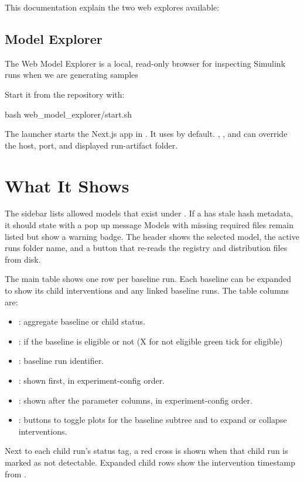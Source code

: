 \documentclass[11pt]{article}
\begin{document}
\label{docstart:web_model_explorer}
This documentation explain the two web explores available:
\subsection*{Model Explorer}

The Web Model Explorer is a local, read-only browser for inspecting \name{} Simulink runs when we are generating samples

Start it from the repository with:
\begin{DocCode}
bash web_model_explorer/start.sh
\end{DocCode}

The launcher starts the Next.js app in . 
It uses  by default. 
, , and  can override the host, port, and displayed run-artifact folder. 

\section*{What It Shows}

The sidebar lists allowed \name{} models that exist under . If a  has stale hash metadata, it should state with a pop up message
Models with missing required files remain listed but show a warning badge. 
The header shows the selected model, the active runs folder name, and a  button that re-reads the registry and distribution files from disk.

The main table shows one row per baseline run. Each baseline can be expanded to show its child interventions and any linked  baseline runs. The table columns are:

\begin{itemize}
\item {}: aggregate baseline or child status.
\item {}: if the baseline is eligible or not (X for not eligible green tick for eligible)
\item {}: baseline run identifier.
\item {}: shown first, in experiment-config order.
\item {}: shown after the parameter columns, in experiment-config order.
\item {}: buttons to toggle plots for the baseline subtree and to expand or collapse interventions.
\end{itemize}
Next to each child run's status tag, a red cross is shown when that child run is marked as not detectable.
Expanded child rows show the intervention timestamp from .
\end{document}
